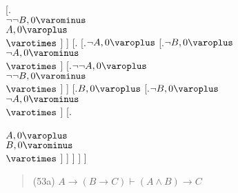 [.{ \\ $\neg \neg B, 0\varominus $ \\ $A, 0\varoplus $ \\ $ \varotimes  $}  ]  ] 
[.{} [.{$\neg A, 0\varoplus $} [.{$\neg B, 0\varoplus $ \\ $\neg A, 0\varominus $ \\ $ \varotimes  $}  ] 
[.{$\neg \neg A, 0\varoplus $ \\ $\neg \neg B, 0\varominus $ \\ $ \varotimes  $}  ]  ] 
[.{$B, 0\varoplus $} [.{$\neg B, 0\varoplus $ \\ $\neg A, 0\varominus $ \\ $ \varotimes  $}  ] 
[.{ \\  \\ $A, 0\varoplus $ \\ $B, 0\varominus $ \\ $ \varotimes  $}  ]  ]  ]  ]  ]


\begin{quote} 
(53a) $ A \rightarrow  (B \rightarrow  C)\vdash  (A \wedge  B) \rightarrow  C $
\end{quote} 
\bigskip

